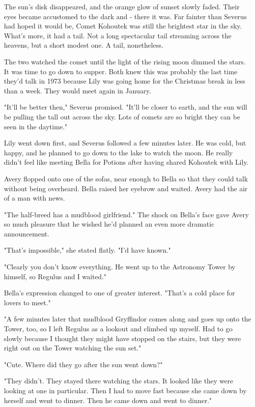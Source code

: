 The sun's disk disappeared, and the orange glow of sunset slowly faded. Their eyes became accustomed to the dark and - there it was. Far fainter than Severus had hoped it would be, Comet Kohoutek was still the brightest star in the sky. What's more, it had a tail. Not a long spectacular tail streaming across the heavens, but a short modest one. A tail, nonetheless.

The two watched the comet until the light of the rising moon dimmed the stars. It was time to go down to supper. Both knew this was probably the last time they'd talk in 1973 because Lily was going home for the Christmas break in less than a week. They would meet again in January.

"It'll be better then," Severus promised. "It'll be closer to earth, and the sun will be pulling the tall out across the sky. Lots of comets are so bright they can be seen in the daytime."

Lily went down first, and Severus followed a few minutes later. He was cold, but happy, and he planned to go down to the lake to watch the moon. He really didn't feel like meeting Bella for Potions after having shared Kohoutek with Lily.

Avery flopped onto one of the sofas, near enough to Bella so that they could talk without being overheard. Bella raised her eyebrow and waited. Avery had the air of a man with news.

"The half-breed has a mudblood girlfriend." The shock on Bella's face gave Avery so much pleasure that he wished he'd planned an even more dramatic announcement.

"That's impossible," she stated flatly. "I'd have known."

"Clearly you don't know everything. He went up to the Astronomy Tower by himself, so Regulus and I waited."

Bella's expression changed to one of greater interest. "That's a cold place for lovers to meet."

"A few minutes later that mudblood Gryffindor comes along and goes up onto the Tower, too, so I left Regulus as a lookout and climbed up myself. Had to go slowly because I thought they might have stopped on the stairs, but they were right out on the Tower watching the sun set."

"Cute. Where did they go after the sun went down?"

"They didn't. They stayed there watching the stars. It looked like they were looking at one in particular. Then I had to move fast because she came down by herself and went to dinner. Then he came down and went to dinner."

